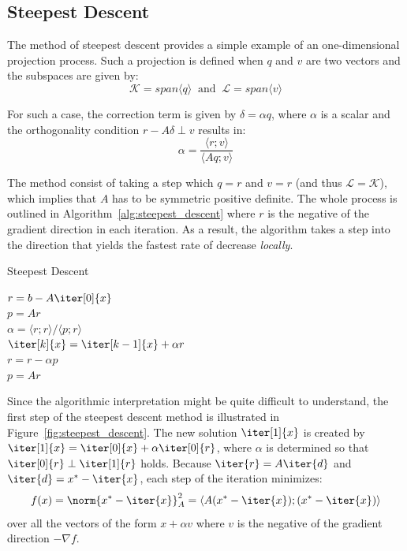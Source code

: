 \subsection{Steepest Descent}
\label{sec:steepest_descent}

The method of steepest descent provides a simple example of an one-dimensional projection process. Such a projection is defined when $q$ and $v$ are two vectors and the subspaces are given by:
\begin{equation}
    \mathcal{K}=span\langle q\rangle\;\; \text{and} \;\; \mathcal{L}=span\langle v\rangle
\end{equation}

\noindent For such a case, the correction term is given by $\delta=\alpha q$, where $\alpha$ is a scalar and the orthogonality condition $r-A\delta \perp v$ results in:
\begin{equation}
    \alpha = \frac{\langle r;v\rangle}{\langle Aq;v\rangle}
\end{equation}

\noindent The method consist of taking a step which $q=r$ and $v=r$ (and thus $\mathcal{L}=\mathcal{K}$), which implies that $A$ has to be symmetric positive definite. The whole process is outlined in  Algorithm~\hyperref[alg:steepest_descent]{\ref{alg:steepest_descent}} where $r$ is the negative of the gradient direction in each iteration. As a result, the algorithm takes a step into the direction that yields the fastest rate of decrease \textit{locally}.

\begin{algorithm}[h]
  \caption{Steepest Descent}
  \label{alg:steepest_descent}
  \SetAlgoLined
  \DontPrintSemicolon
  $r = b-A\iter[0]{x}$ \\
  $p = Ar$ \\
   {
    $\alpha = \langle r;r \rangle / \langle p;r \rangle$ \\
    $\iter[k]{x} = \iter[k-1]{x}+\alpha r$ \\
    $r = r - \alpha p$ \\
    $p = Ar$ \\
  }
\end{algorithm}

\noindent Since the algorithmic interpretation might be quite difficult to understand, the first step of the steepest descent method is illustrated in Figure~\hyperref[fig:steepest_descent]{\ref{fig:steepest_descent}}. The new solution $\iter[1]{x}$ is created by $\iter[1]{x}=\iter[0]{x}+\alpha \iter[0]{r}$, where $\alpha$ is determined so that $\iter[0]{r} \perp \iter[1]{r}$ holds. Because $\iter{r}=A\iter{d}$ and $\iter{d}=x^*-\iter{x}$, each step of the iteration minimizes:
\begin{equation}
f(x) = \norm{x^*-\iter{x}}_A^2 = \langle A(x^*-\iter{x});(x^*-\iter{x})\rangle
\end{equation}
\noindent over all the vectors of the form $x+\alpha v$ where $v$ is the negative of the gradient direction $-\nabla f$.


